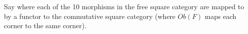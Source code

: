 Say where each of the 10 morphisms in the free square category are mapped to by a functor to the commutative square category (where $Ob(F)$ maps each corner to the same corner).